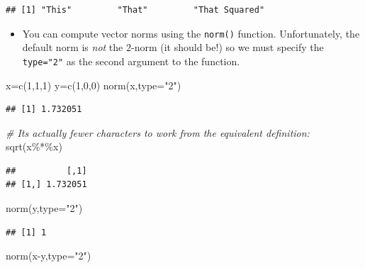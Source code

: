 \documentclass[
]{article}
\newenvironment{Shaded}{\begin{snugshade}}{\end{snugshade}}
\newcommand{\AttributeTok}[1]{\textcolor[rgb]{0.77,0.63,0.00}{#1}}
\newcommand{\CommentTok}[1]{\textcolor[rgb]{0.56,0.35,0.01}{\textit{#1}}}
\newcommand{\DecValTok}[1]{\textcolor[rgb]{0.00,0.00,0.81}{#1}}
\newcommand{\FunctionTok}[1]{\textcolor[rgb]{0.00,0.00,0.00}{#1}}
\newcommand{\NormalTok}[1]{#1}
\newcommand{\OtherTok}[1]{\textcolor[rgb]{0.56,0.35,0.01}{#1}}
\newcommand{\SpecialCharTok}[1]{\textcolor[rgb]{0.00,0.00,0.00}{#1}}
\newcommand{\StringTok}[1]{\textcolor[rgb]{0.31,0.60,0.02}{#1}}
\providecommand{\tightlist}{%
  \setlength{\itemsep}{0pt}\setlength{\parskip}{0pt}}
\theoremstyle{definition}
\theoremstyle{definition}
\theoremstyle{definition}
\theoremstyle{definition}
\theoremstyle{remark}
\begin{document}
\begin{verbatim}
## [1] "This"         "That"         "That Squared"
\end{verbatim}

\begin{itemize}
\tightlist
\item
  You can compute vector norms using the \texttt{norm()} function. Unfortunately, the default norm is \emph{not} the \(2\)-norm (it should be!) so we must specify the \texttt{type="2"} as the second argument to the function.
\end{itemize}

\begin{Shaded}
\begin{Highlighting}[]
\NormalTok{x}\OtherTok{=}\FunctionTok{c}\NormalTok{(}\DecValTok{1}\NormalTok{,}\DecValTok{1}\NormalTok{,}\DecValTok{1}\NormalTok{)}
\NormalTok{y}\OtherTok{=}\FunctionTok{c}\NormalTok{(}\DecValTok{1}\NormalTok{,}\DecValTok{0}\NormalTok{,}\DecValTok{0}\NormalTok{)}
\FunctionTok{norm}\NormalTok{(x,}\AttributeTok{type=}\StringTok{"2"}\NormalTok{)}
\end{Highlighting}
\end{Shaded}

\begin{verbatim}
## [1] 1.732051
\end{verbatim}

\begin{Shaded}
\begin{Highlighting}[]
\CommentTok{\# It\textquotesingle{}s actually fewer characters to work from the equivalent definition:}
\FunctionTok{sqrt}\NormalTok{(x}\SpecialCharTok{\%*\%}\NormalTok{x)}
\end{Highlighting}
\end{Shaded}

\begin{verbatim}
##          [,1]
## [1,] 1.732051
\end{verbatim}

\begin{Shaded}
\begin{Highlighting}[]
\FunctionTok{norm}\NormalTok{(y,}\AttributeTok{type=}\StringTok{"2"}\NormalTok{)}
\end{Highlighting}
\end{Shaded}

\begin{verbatim}
## [1] 1
\end{verbatim}

\begin{Shaded}
\begin{Highlighting}[]
\FunctionTok{norm}\NormalTok{(x}\SpecialCharTok{{-}}\NormalTok{y,}\AttributeTok{type=}\StringTok{"2"}\NormalTok{)}
\end{Highlighting}
\end{Shaded}
\end{document}
